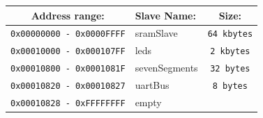 \begin{tabular}{|c|l|c|}
  \hline
  \textbf{Address range:}&\textbf{Slave Name:}&\textbf{Size:}\\
  \hline
  \hline
  \texttt{0x00000000 - 0x0000FFFF}&sramSlave&\texttt{64 kbytes}\\
  \hline
  \texttt{0x00010000 - 0x000107FF}&leds&\texttt{2 kbytes}\\
  \hline
  \texttt{0x00010800 - 0x0001081F}&sevenSegments&\texttt{32 bytes}\\
  \hline
  \texttt{0x00010820 - 0x00010827}&uartBus&\texttt{8 bytes}\\
  \hline
  \texttt{0x00010828 - 0xFFFFFFFF}&empty&\texttt{}\\
  \hline
\end{tabular}
